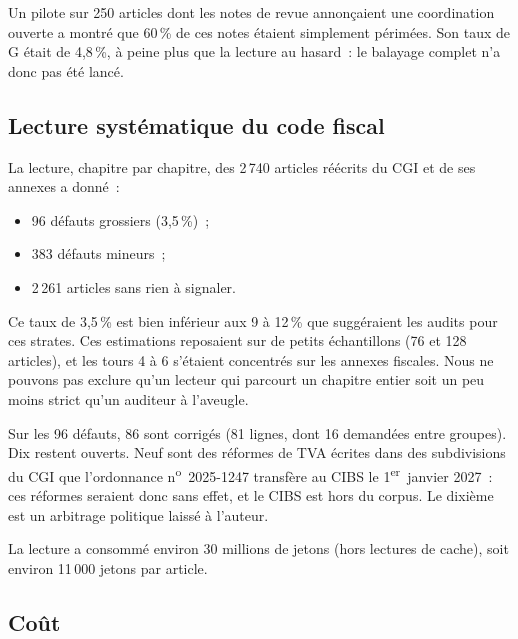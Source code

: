 \documentclass[11pt,a4paper]{article}
\begin{document}
Un pilote sur 250 articles dont les notes de revue annonçaient une coordination ouverte a montré que 60\,\% de ces notes étaient simplement périmées. Son taux de G était de 4,8\,\%, à peine plus que la lecture au hasard~: le balayage complet n'a donc pas été lancé.

\subsection{Lecture systématique du code fiscal}

La lecture, chapitre par chapitre, des 2\,740 articles réécrits du CGI et de ses annexes a donné~:
\begin{itemize}
  \item 96 défauts grossiers (3,5\,\%)~;
  \item 383 défauts mineurs~;
  \item 2\,261 articles sans rien à signaler.
\end{itemize}
Ce taux de 3,5\,\% est bien inférieur aux 9 à 12\,\% que suggéraient les audits pour ces strates. Ces estimations reposaient sur de petits échantillons (76 et 128 articles), et les tours 4 à 6 s'étaient concentrés sur les annexes fiscales. Nous ne pouvons pas exclure qu'un lecteur qui parcourt un chapitre entier soit un peu moins strict qu'un auditeur à l'aveugle.

Sur les 96 défauts, 86 sont corrigés (81 lignes, dont 16 demandées entre groupes). Dix restent ouverts. Neuf sont des réformes de TVA écrites dans des subdivisions du CGI que l'ordonnance n\textsuperscript{o}~2025-1247 transfère au CIBS le 1\textsuperscript{er}~janvier 2027~: ces réformes seraient donc sans effet, et le CIBS est hors du corpus. Le dixième est un arbitrage politique laissé à l'auteur.

La lecture a consommé environ 30 millions de jetons (hors lectures de cache), soit environ 11\,000 jetons par article.

\subsection{Coût}
\label{sec:cost}
\end{document}
